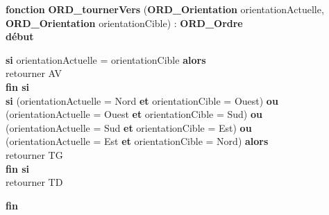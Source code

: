 \documentclass[a4paper, 11pt]{article}
\begin{document}
\noindent\textbf{fonction} \textbf{ORD\_tournerVers} (\textbf{ORD\_Orientation} orientationActuelle, \textbf{ORD\_Orientation} orientationCible) : \textbf{ORD\_Ordre}\\
\textbf{début}
\begin{flushleft}
    \hspace*{1cm}\textbf{si} orientationActuelle = orientationCible \textbf{alors}\\
    \hspace*{2cm}retourner AV\\
    \hspace*{1cm}\textbf{fin si}\\
    \hspace*{1cm}\textbf{si} (orientationActuelle = Nord \textbf{et} orientationCible = Ouest) \textbf{ou}\\
    \hspace*{2cm}(orientationActuelle = Ouest \textbf{et} orientationCible = Sud) \textbf{ou}\\
    \hspace*{2cm}(orientationActuelle = Sud \textbf{et} orientationCible = Est) \textbf{ou}\\
    \hspace*{2cm}(orientationActuelle = Est \textbf{et} orientationCible = Nord) \textbf{alors}\\
    \hspace*{2cm}retourner TG\\
    \hspace*{1cm}\textbf{fin si}\\
    \hspace*{1cm}retourner TD
\end{flushleft}
\textbf{fin}\\
\end{document}
